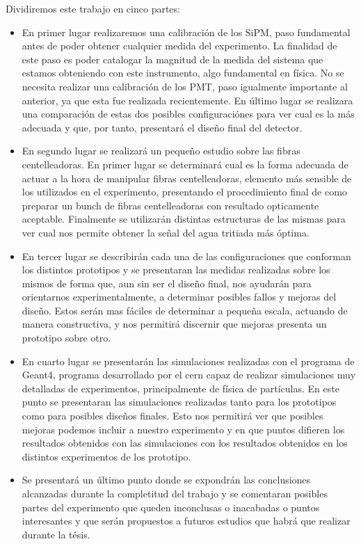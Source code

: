 Dividiremos este trabajo en cinco partes:
\begin{itemize}
\item{} En primer lugar realizaremos una calibración de los SiPM, paso fundamental antes de poder obtener cualquier medida del experimento. La finalidad de este paso es poder catalogar la magnitud de la medida del sistema que estamos obteniendo con este instrumento, algo fundamental en física. No se necesita realizar una calibración de los PMT, paso igualmente importante al anterior, ya que esta fue realizada recientemente. 
\newline
En último lugar se realizara una comparación de estas dos posibles configuraciónes para ver cual es la más adecuada y que, por tanto, presentará el diseño final del detector.

\item{} En segundo lugar se realizará un pequeño estudio sobre las fibras centelleadoras. En primer lugar se determinará cual es la forma adecuada de actuar a la hora de manipular fibras centelleadoras, elemento más sensible de los utilizados en el experimento, presentando el procedimiento final de como preparar un bunch de fibras centelleadoras con resultado opticamente aceptable. Finalmente se utilizarán distintas estructuras de las mismas para ver cual nos permite obtener la señal del agua tritiada  más óptima. 

\item{} En tercer lugar se describirán cada una de las configuraciones que conforman los distintos prototipos y se presentaran las medidas realizadas sobre los mismos de forma que, aun sin ser el diseño final, nos ayudarán para orientarnos experimentalmente, a determinar posibles fallos y mejoras del diseño. Estos serán mas fáciles de determinar a pequeña escala, actuando de manera constructiva, y nos permitirá discernir que mejoras presenta un prototipo sobre otro. 

\item{} En cuarto lugar se presentarán las simulaciones realizadas con el programa de Geant4, programa desarrollado por el cern capaz de realizar simulaciones muy detalladas de experimentos, principalmente de física de partículas. En este punto se presentaran las simulaciones realizadas tanto para los prototipos como para posibles diseños finales. Esto nos permitirá ver que posibles mejoras podemos incluir a nuestro experimento y en que puntos difieren los resultados obtenidos con las simulaciones con los resultados obtenidos en los distintos experimentos de los prototipo.

\item{} Se presentará un último punto donde se expondrán las conclusiones alcanzadas durante la completitud del trabajo y se comentaran posibles partes del experimento que queden inconclusas o inacabadas o puntos interesantes y que serán propuestos a futuros estudios que habrá que realizar durante la tésis.
\end{itemize}

\newpage
